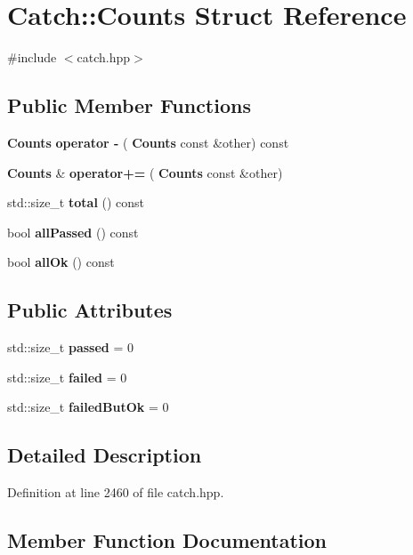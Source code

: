 \section{Catch\+::Counts Struct Reference}
\label{struct_catch_1_1_counts}


{\ttfamily \#include $<$catch.\+hpp$>$}

\subsection*{Public Member Functions}
\begin{DoxyCompactItemize}
\item 
\textbf{ Counts} \textbf{ operator -\/} (\textbf{ Counts} const \&other) const
\item 
\textbf{ Counts} \& \textbf{ operator+=} (\textbf{ Counts} const \&other)
\item 
std\+::size\+\_\+t \textbf{ total} () const
\item 
bool \textbf{ all\+Passed} () const
\item 
bool \textbf{ all\+Ok} () const
\end{DoxyCompactItemize}
\subsection*{Public Attributes}
\begin{DoxyCompactItemize}
\item 
std\+::size\+\_\+t \textbf{ passed} = 0
\item 
std\+::size\+\_\+t \textbf{ failed} = 0
\item 
std\+::size\+\_\+t \textbf{ failed\+But\+Ok} = 0
\end{DoxyCompactItemize}


\subsection{Detailed Description}


Definition at line 2460 of file catch.\+hpp.



\subsection{Member Function Documentation}
\mbox{\label{struct_catch_1_1_counts_a33bd996e016030155b99fe1c51c08991}} 
